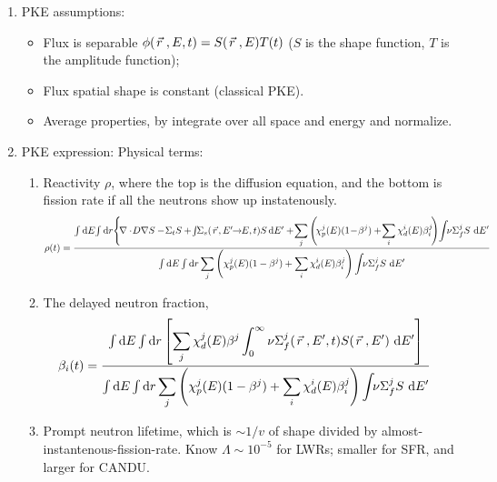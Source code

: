 \documentclass{school-22.211-notes}
\begin{document}
\clearpage
{}
\begin{enumerate}
\item PKE assumptions: 
  \begin{itemize}
  \item Flux is separable $\phi(\left.\vec{r}\right., E, t) = S(\left.\vec{r}\right., E) T(t)$ ($S$ is the shape function, $T$ is the amplitude function); 
  \item Flux spatial shape is constant (classical PKE). 
  \item Average properties, by integrate over all space and energy and normalize. 
\end{itemize}

\item PKE expression: 
    Physical terms: 
      \begin{enumerate}
      \item Reactivity $\rho$, where the top is the diffusion equation, and the bottom is fission rate if all the neutrons show up instatenously. 
        \scriptsize
        \begin{align}
          \rho (t) &= \frac{\int \bsp \dE \! \int \bsp \dr \Bigg\{ \!\divergence \! D  \gradient S  - \! \Sigma_t S  + \! \int \bsp \Sigma_s (\vecr \!, E' \bsp \to \bsp E, t) S \! \dE'   
            + \! \Sum_j \left( \! \chi_p^j (E) (1 \! - \! \beta^j) +  \! \Sum_i \chi_d^i (E) \beta_i^j \! \right) \! \int \bsp \nu \Sigma_f^j  S \dE'  }{\int \bsp \dE \int \bsp \dr \Sum_j \left( \chi_p^j (E) (1-\beta^j) + \Sum_i \chi_d^i (E) \beta_i^j \right) \int \bsp \nu \Sigma_f^j S \dE'} 
        \end{align}
        \normalsize

      \item The delayed neutron fraction, 
        \begin{align}
          \beta_i (t) &= \frac{\int \bsp \dE \int \bsp \dr \left[ \Sum_j \chi_d^j (E) \beta^j \int_0^{\infty} \nu \Sigma_f^j (\vecr, E', t) S(\vecr, E') \dE' \right] }{\int \bsp \dE \int \bsp \dr \Sum_j \left( \chi_p^j (E) (1-\beta^j) + \Sum_i \chi_d^i (E) \beta_i^j \right) \int \bsp \nu \Sigma_f^j S \dE'} 
        \end{align}

      \item Prompt neutron lifetime, which is $\sim 1/v$ of shape divided by almost-instantenous-fission-rate. Know $\Lambda \sim 10^{-5}$ for LWRs; smaller for SFR, and larger for CANDU. 


\end{enumerate}
\end{enumerate}
\end{document}
